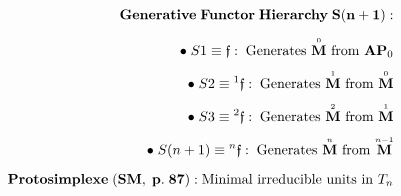 \documentclass[preview]{standalone}
\begin{document}
\begin{align*}
\special{dvisvgm:raw <g id='unique000'>}\mathbf{Generative\;Functor\;Hierarchy\;S(n+1):}\\[5pt]\bullet\;S1 \equiv \mathfrak{f}:\;\text{Generates }\overset{\scriptscriptstyle 0}{\mathbf{M}}\text{ from }\mathbf{AP}_0\\[3pt]\bullet\;S2 \equiv {}^1\mathfrak{f}:\;\text{Generates }\overset{\scriptscriptstyle 1}{\mathbf{M}}\text{ from }\overset{\scriptscriptstyle 0}{\mathbf{M}}\\[3pt]\bullet\;S3 \equiv {}^2\mathfrak{f}:\;\text{Generates }\overset{\scriptscriptstyle 2}{\mathbf{M}}\text{ from }\overset{\scriptscriptstyle 1}{\mathbf{M}}\\[3pt]\bullet\;S(n+1) \equiv {}^n\mathfrak{f}:\;\text{Generates }\overset{\scriptscriptstyle n}{\mathbf{M}}\text{ from }\overset{\scriptscriptstyle n-1}{\mathbf{M}}\\[6pt]\mathbf{Protosimplexe\;(SM,\;p.\;87):}\;\text{Minimal irreducible units in }T_n\special{dvisvgm:raw </g>}
\end{align*}
\end{document}
